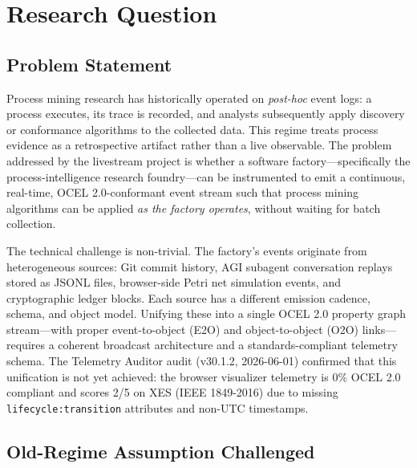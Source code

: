 
\section{Research Question}
\label{sec:livestream-rq}

\subsection{Problem Statement}
\label{sec:livestream-rq-problem}

Process mining research has historically operated on \emph{post-hoc} event logs:
a process executes, its trace is recorded, and analysts subsequently apply discovery
or conformance algorithms to the collected data. This regime treats process evidence
as a retrospective artifact rather than a live observable. The problem addressed by
the livestream project is whether a software factory---specifically the
process-intelligence research foundry---can be instrumented to emit a continuous,
real-time, OCEL 2.0-conformant event stream such that process mining algorithms can
be applied \emph{as the factory operates}, without waiting for batch collection.

The technical challenge is non-trivial. The factory's events originate from
heterogeneous sources: Git commit history, AGI subagent conversation replays stored
as JSONL files, browser-side Petri net simulation events, and cryptographic ledger
blocks. Each source has a different emission cadence, schema, and object model.
Unifying these into a single OCEL 2.0 property graph stream---with proper
event-to-object (E2O) and object-to-object (O2O) links---requires a coherent
broadcast architecture and a standards-compliant telemetry schema. The Telemetry
Auditor audit (v30.1.2, 2026-06-01) confirmed that this unification is not yet
achieved: the browser visualizer telemetry is 0\% OCEL 2.0 compliant and scores
2/5 on XES (IEEE 1849-2016) due to missing \texttt{lifecycle:transition} attributes
and non-UTC timestamps.

\subsection{Old-Regime Assumption Challenged}
\label{sec:livestream-rq-old-regime}

